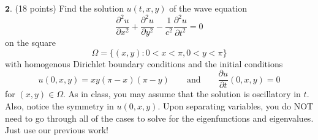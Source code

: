 \documentclass[12pt]{article}
\begin{document}
\noindent $\textbf{2}$. (18 points) 
Find the solution $u(t,x,y)$ of the wave equation
\begin{equation}
\label{WE}
\tag{WE}
\frac{\partial^2 u}{\partial x^2} + \frac{\partial^2 u}{\partial y^2} - \frac{1}{c^2} \frac{\partial^2 u}{\partial t^2}  = 0
\end{equation}
on the square 
$$\Omega = \{(x,y) : 0 < x < \pi , 0 < y < \pi \}$$
with homogenous Dirichlet boundary conditions and the initial conditions 
$$u(0,x,y) = xy(\pi-x)(\pi-y) \qquad \mathrm{and} \qquad \frac{\partial u}{\partial t}(0,x,y) = 0$$
for $(x,y) \in \Omega$.
As in class, you may assume that the solution is oscillatory in $t$. Also, notice the symmetry in $u(0,x, y)$.
Upon separating variables, you do NOT need to go through all of the cases to solve for the eigenfunctions and eigenvalues. Just use our previous work! \\ \\
\end{document}
